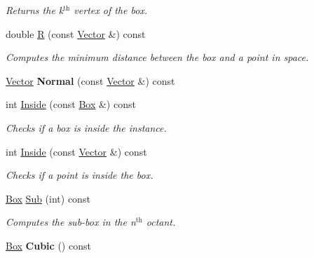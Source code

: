 \begin{DoxyCompactItemize}
\begin{DoxyCompactList}\small\item\em Returns the k$^{\mbox{th}}$  vertex of the box. \item\end{DoxyCompactList}\item 
\hypertarget{class_box_a913a6b1487999917a85d87b49b3c1c52}{
double \hyperlink{class_box_a913a6b1487999917a85d87b49b3c1c52}{R} (const \hyperlink{class_vector}{Vector} \&) const }
\label{class_box_a913a6b1487999917a85d87b49b3c1c52}

\begin{DoxyCompactList}\small\item\em Computes the minimum distance between the box and a point in space. \item\end{DoxyCompactList}\item 
\hypertarget{class_box_a80db61cd35cae3122fe658ac079495ee}{
\hyperlink{class_vector}{Vector} {\bfseries Normal} (const \hyperlink{class_vector}{Vector} \&) const }
\label{class_box_a80db61cd35cae3122fe658ac079495ee}

\item 
\hypertarget{class_box_abc15073158a80e02f4b1fb32b50e1eb6}{
int \hyperlink{class_box_abc15073158a80e02f4b1fb32b50e1eb6}{Inside} (const \hyperlink{class_box}{Box} \&) const }
\label{class_box_abc15073158a80e02f4b1fb32b50e1eb6}

\begin{DoxyCompactList}\small\item\em Checks if a box is inside the instance. \item\end{DoxyCompactList}\item 
\hypertarget{class_box_aa3a80d26840216d02e1096e28333d65b}{
int \hyperlink{class_box_aa3a80d26840216d02e1096e28333d65b}{Inside} (const \hyperlink{class_vector}{Vector} \&) const }
\label{class_box_aa3a80d26840216d02e1096e28333d65b}

\begin{DoxyCompactList}\small\item\em Checks if a point is inside the box. \item\end{DoxyCompactList}\item 
\hypertarget{class_box_a830204e3b9e91fbcbe79ba0d6e9ff075}{
\hyperlink{class_box}{Box} \hyperlink{class_box_a830204e3b9e91fbcbe79ba0d6e9ff075}{Sub} (int) const }
\label{class_box_a830204e3b9e91fbcbe79ba0d6e9ff075}

\begin{DoxyCompactList}\small\item\em Computes the sub-\/box in the n$^{\mbox{th}}$  octant. \item\end{DoxyCompactList}\item 
\hypertarget{class_box_a1b95e5c08d3ef360904854beea1ae757}{
\hyperlink{class_box}{Box} {\bfseries Cubic} () const }
\label{class_box_a1b95e5c08d3ef360904854beea1ae757}

\end{DoxyCompactItemize}
